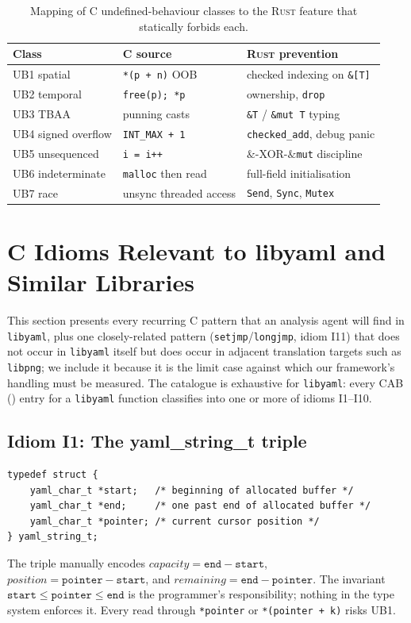 \documentclass[12pt]{article}
\newcommand{\rust}{\textnormal{\textsc{Rust}}}
\newcommand{\clang}{\textnormal{\textsc{C}}}
\newcommand{\libyaml}{\texttt{libyaml}}
\theoremstyle{definition}
\theoremstyle{remark}
\begin{document}
\begin{table}[h]
\centering
\begin{tabular}{|l|l|l|}
\hline
\textbf{Class} & \textbf{C source} & \textbf{\rust{} prevention} \\
\hline
UB1 spatial & \texttt{*(p + n)} OOB & checked indexing on \texttt{\&[T]} \\
UB2 temporal & \texttt{free(p); *p} & ownership, \texttt{drop} \\
UB3 TBAA & punning casts & \texttt{\&T} / \texttt{\&mut T} typing \\
UB4 signed overflow & \texttt{INT\_MAX + 1} & \texttt{checked\_add}, debug panic \\
UB5 unsequenced & \texttt{i = i++} & \(\&\)-XOR-\(\&\)\texttt{mut} discipline \\
UB6 indeterminate & \texttt{malloc} then read & full-field initialisation \\
UB7 race & unsync threaded access & \texttt{Send}, \texttt{Sync}, \texttt{Mutex} \\
\hline
\end{tabular}
\caption{Mapping of \clang{} undefined-behaviour classes to the \rust{} feature that statically forbids each.}
\label{tab:ub-mapping}
\end{table}

\section{C Idioms Relevant to libyaml and Similar Libraries}
\label{sec:libyaml-idioms}

This section presents every recurring \clang{} pattern that an analysis agent will find in \libyaml{}, plus one closely-related pattern (\texttt{setjmp}/\texttt{longjmp}, idiom I11) that does not occur in \libyaml{} itself but does occur in adjacent translation targets such as \texttt{libpng}; we include it because it is the limit case against which our framework's handling must be measured. The catalogue is exhaustive for \libyaml{}: every CAB () entry for a \libyaml{} function classifies into one or more of idioms I1--I10.

\subsection{Idiom I1: The yaml\_string\_t triple}
\label{idiom:string}
\begin{lstlisting}[style=cstyle, caption={From \texttt{yaml\_private.h}}]
typedef struct {
    yaml_char_t *start;   /* beginning of allocated buffer */
    yaml_char_t *end;     /* one past end of allocated buffer */
    yaml_char_t *pointer; /* current cursor position */
} yaml_string_t;
\end{lstlisting}
The triple manually encodes \(\mathit{capacity} = \texttt{end} - \texttt{start}\), \(\mathit{position} = \texttt{pointer} - \texttt{start}\), and \(\mathit{remaining} = \texttt{end} - \texttt{pointer}\). The invariant \(\texttt{start} \leq \texttt{pointer} \leq \texttt{end}\) is the programmer's responsibility; nothing in the type system enforces it. Every read through \texttt{*pointer} or \texttt{*(pointer + k)} risks UB1.
\end{document}
